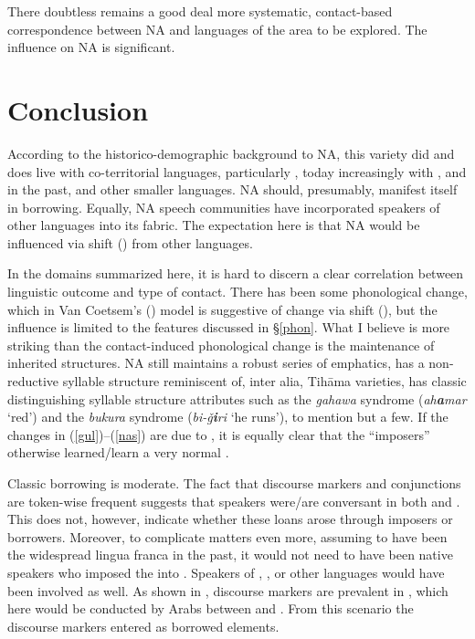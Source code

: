 \documentclass[output=paper]{langsci/langscibook}
\begin{document}
There doubtless remains a good deal more systematic, contact-based correspondence between NA and languages of the  area to be explored. The influence on NA is significant.

\section{Conclusion
} \label{conc}

According to the historico-demographic background to NA, this variety did and does live with co-territorial languages, particularly , today increasingly with , and in the past,  and other smaller languages. NA  should, presumably, manifest itself in borrowing. Equally, NA speech communities have incorporated speakers of other languages into its fabric. The expectation here is that NA would be influenced via shift () from other languages.

In the domains summarized here, it is hard to discern a clear correlation between linguistic outcome and type of contact. There has been some phonological change, which in Van Coetsem’s (\citeyear{VanCoetsem1988,VanCoetsem2000}) model is suggestive of change via shift (), but the influence is limited to the features discussed in §\ref{phon}. What I believe is more striking than the contact-induced phonological change is the maintenance of inherited structures. NA still maintains a robust series of emphatics, has a non-reductive syllable structure reminiscent of, inter alia, Tihāma varieties, has classic distinguishing syllable structure attributes such as the \textit{gahawa} syndrome (\textit{ah}\textbf{\textit{a}}\textit{mar} ‘red’) and the \textit{bukura} syndrome (\textit{bi-ǧ}\textbf{\textit{i}}\textit{ri} ‘he runs’), to mention but a few. If the changes in (\ref{gul})–(\ref{nas}) are due to , it is equally clear that the “imposers” otherwise learned/learn a very normal .


Classic borrowing is moderate. The fact that discourse markers and conjunctions are token-wise frequent suggests that speakers were/are conversant in both  and . This does not, however, indicate whether these loans arose through imposers or borrowers. Moreover, to complicate matters even more, assuming  to have been the widespread lingua franca in the past, it would not need to have been native  speakers who imposed the  into . Speakers of , ,  or other languages would have been involved as well. As shown in \citet{OwensHassan2010}, discourse markers are prevalent in , which here would be conducted by Arabs  between  and . From this scenario the discourse markers entered as borrowed elements.
\end{document}
